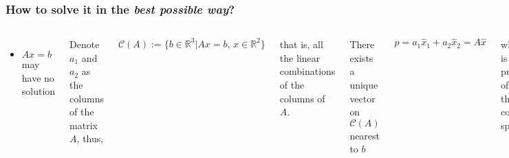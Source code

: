\documentclass[aspectratio=169]{beamer}
\newcommand{\incfig}[2][1]{%
    \def\svgwidth{#1\columnwidth}
    {#2.pdf_tex} }
\begin{document}
\begin{frame} %
	\frametitle{How to solve it in the \textit{best possible way}?}
	
	\begin{columns}

	\begin{itemize}
		\item $Ax = b$ may have no solution
	\end{itemize}	

	Denote $a_1$ and $a_2$ as the columns of the matrix $A$, thus,

	\[ \mathcal{C}(A) := \{ b \in \mathbb{R}^3 | Ax = b, \, x \in \mathbb{R}^2 \} \]

	that is, all the linear combinations of the columns of $A$.

	There exists a unique vector on $\mathcal{C}(A)$ nearest to $b$

	\[ p = a_1 \hat{x}_1 + a_2 \hat{x}_2 = A\hat{x} \] 

	\noindent where $p$ is the projection of $b$ onto the column space!
\begin{itemize}
	\item A possible alternative $A \hat{x} = p$ 
\end{itemize}

\begin{figure}[ht]
    \centering
    \incfig{mainissue}
    \label{fig:mainissue}
\end{figure}

\end{columns}
\end{frame}
\end{document}
